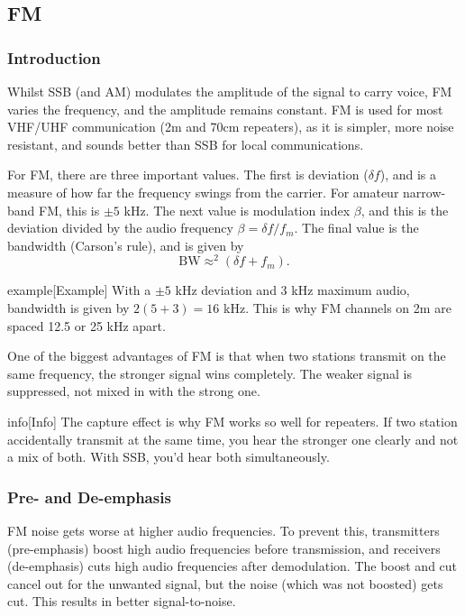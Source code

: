 \documentclass{article}
\begin{document}
\subsection{FM}
\subsubsection{Introduction}
Whilst SSB (and AM) modulates the amplitude of the signal to carry voice, FM varies the frequency, and the amplitude remains constant. FM is used for most VHF/UHF communication (2m and 70cm repeaters), as it is simpler, more noise resistant, and sounds better than SSB for local communications.

For FM, there are three important values. The first is deviation ($\delta f$), and is a measure of how far the frequency swings from the carrier. For amateur narrow-band FM, this is $\pm 5$ kHz. The next value is modulation index $\beta $, and this is the deviation divided by the audio frequency $\beta =\delta f/f_m$. The final value is the bandwidth (Carson's rule), and is given by
\[
    \text{BW}\approx^2(\delta f+f_m).
\]

\begin{callout}{example}[Example]
    With a $\pm 5$ kHz deviation and 3 kHz maximum audio, bandwidth is given by $2(5+3)=16$ kHz. This is why FM channels on 2m are spaced 12.5 or 25 kHz apart.
\end{callout}

One of the biggest advantages of FM is that when two stations transmit on the same frequency, the stronger signal wins completely. The weaker signal is suppressed, not mixed in with the strong one.

\begin{callout}{info}[Info]
    The capture effect is why FM works so well for repeaters. If two station accidentally transmit at the same time, you hear the stronger one clearly and not a mix of both. With SSB, you'd hear both simultaneously.
\end{callout}

\subsubsection{Pre- and De-emphasis}
FM noise gets worse at higher audio frequencies. To prevent this, transmitters (pre-emphasis) boost high audio frequencies before transmission, and receivers (de-emphasis) cuts high audio frequencies after demodulation. The boost and cut cancel out for the unwanted signal, but the noise (which was not boosted) gets cut. This results in better signal-to-noise.
\end{document}
